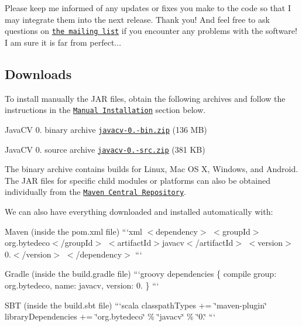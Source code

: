 Please keep me informed of any updates or fixes you make to the code so that I may integrate them into the next release. Thank you! And feel free to ask questions on \href{http://groups.google.com/group/javacv}{\tt the mailing list} if you encounter any problems with the software! I am sure it is far from perfect...

\subsection*{Downloads }

To install manually the J\+A\+R files, obtain the following archives and follow the instructions in the \href{#manual-installation}{\tt Manual Installation} section below.


\begin{DoxyItemize}
\item Java\+C\+V 0. binary archive \href{http://search.maven.org/remotecontent?filepath=org/bytedeco/javacv/0.10/javacv-0.10-bin.zip}{\tt javacv-\/0.-\/bin.\+zip} (136 M\+B)
\item Java\+C\+V 0. source archive \href{http://search.maven.org/remotecontent?filepath=org/bytedeco/javacv/0.10/javacv-0.10-src.zip}{\tt javacv-\/0.-\/src.\+zip} (381 K\+B)
\end{DoxyItemize}

The binary archive contains builds for Linux, Mac O\+S X, Windows, and Android. The J\+A\+R files for specific child modules or platforms can also be obtained individually from the \href{http://search.maven.org/#search|ga|1|bytedeco}{\tt Maven Central Repository}.

We can also have everything downloaded and installed automatically with\+:


\begin{DoxyItemize}
\item Maven (inside the {\ttfamily pom.\+xml} file) ```xml $<$dependency$>$ $<$group\+Id$>$org.\+bytedeco$<$/group\+Id$>$ $<$artifact\+Id$>$javacv$<$/artifact\+Id$>$ $<$version$>$0.$<$/version$>$ $<$/dependency$>$ ```
\item Gradle (inside the {\ttfamily build.\+gradle} file) ```groovy dependencies \{ compile group\+: \textquotesingle{}org.\+bytedeco\textquotesingle{}, name\+: \textquotesingle{}javacv\textquotesingle{}, version\+: \textquotesingle{}0.\textquotesingle{} \} ```
\item S\+B\+T (inside the {\ttfamily build.\+sbt} file) ```scala classpath\+Types += \char`\"{}maven-\/plugin\char`\"{} library\+Dependencies += \char`\"{}org.\+bytedeco\char`\"{} \% \char`\"{}javacv\char`\"{} \% \char`\"{}0.\char`\"{} ```
\end{DoxyItemize}

